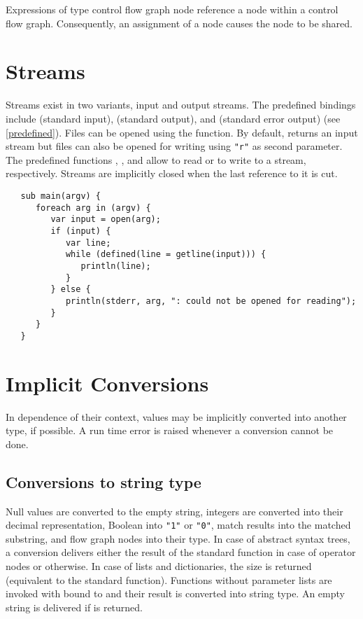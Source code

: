 \bigskip
\noindent
Expressions of type control flow graph node reference a node within a
control flow graph. Consequently, an assignment of a node causes the
node to be shared.

\section{Streams}
Streams exist in two variants, input and output streams. The
predefined bindings include
 (standard input),
 (standard output), and
 (standard error output)
(see \ref{predefined}).
Files can be opened using the 
function. By default,  returns an input stream
but files can also be opened for writing using \lstinline!"r"!
as second parameter.
The predefined functions ,
, and 
allow to read or to write to a stream, respectively. Streams
are implicitly closed when the last reference to it is cut.

\begin{lstlisting}
   sub main(argv) {
      foreach arg in (argv) {
         var input = open(arg);
         if (input) {
            var line;
            while (defined(line = getline(input))) {
               println(line);
            }
         } else {
            println(stderr, arg, ": could not be opened for reading");
         }
      }
   }
\end{lstlisting}

\section{Implicit Conversions}

In dependence of their context, values may be implicitly converted
into another type, if possible. A run time error is raised whenever
a conversion cannot be done.

\subsection{Conversions to string type}\label{functionconv}
\label{stringconv}

Null values are converted to the empty string,
integers are converted into their decimal representation,
Boolean into \lstinline!"1"! or \lstinline!"0"!,
match results into the matched substring, and
flow graph nodes into their type. In case of
abstract syntax trees, a conversion delivers either the result of
the standard function  in case of
operator nodes or  otherwise. In case
of lists and dictionaries, the size is returned (equivalent to the
 standard function). Functions without
parameter lists are invoked with
 bound to  and their result is converted
into string type. An empty string is delivered if  is
returned.

